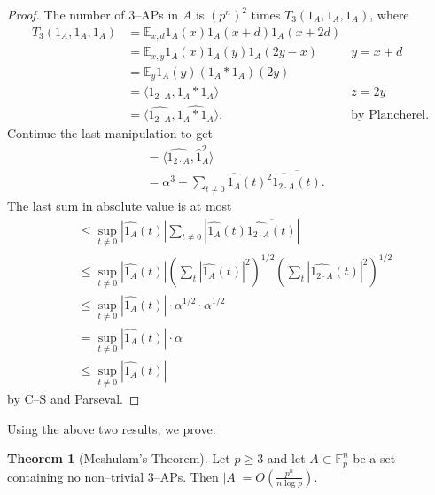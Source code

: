 \documentclass{article}
\theoremstyle{definition}
\newtheorem{theorem}{Theorem}[section]
\begin{document}
\begin{proof}
    The number of 3--APs in $A$ is $(p^n)^2$ times $T_3(1_A,1_A,1_A)$, where
    \begin{align*}
        T_3(1_A,1_A,1_A) &= \mathbb{E}_{x,d}1_A(x)1_A(x+d)1_A(x+2d) \\
        &= \mathbb{E}_{x,y}1_A(x)1_A(y)1_A(2y-x) &y=x+d\\
        &= \mathbb{E}_{y}1_A(y) (1_A * 1_A)(2y) \\
        &= \langle 1_{2\cdot A}, 1_A * 1_A \rangle &z=2y\\
        &= \langle \widehat{1_{2\cdot A}}, \widehat{1_A * 1_A}\rangle. &\text{by Plancherel}.
    \end{align*}
    Continue the last manipulation to get 
    \begin{align*}
        &= \langle \widehat{1_{2\cdot A}}, \hat{1}_A^2 \rangle \\
        &= \alpha^3 + \sum_{t \neq 0}^{} \widehat{1_A}(t)^2 \overline{\widehat{1_{2\cdot A}}(t)}.
    \end{align*}
    The last sum in absolute value is at most 
    \begin{align*}
        &\le \sup_{t \neq 0}|\widehat{1_A}(t)|\sum_{t\neq0}^{} |\widehat{1_A}(t)\overline{\widehat{1_{2\cdot A}}(t)}| \\
        &\le \sup_{t\neq 0}|\widehat{1_A}(t)| \left(\sum_{t}^{} |\widehat{1_A}(t)|^2\right)^{1/2}\left(\sum_{t}^{} |\widehat{1_{2\cdot A}}(t)|^2\right)^{1/2}\\
        &\le \sup_{t \neq 0}|\widehat{1_A}(t)|\cdot \alpha^{1/2} \cdot \alpha^{1/2} \\
        &= \sup_{t \neq 0}|\widehat{1_A}(t)|\cdot \alpha\\
        &\le \sup_{t \neq 0}|\widehat{1_A}(t)|
    \end{align*}
    by C--S and Parseval.
\end{proof}
Using the above two results, we prove:
\begin{theorem}[Meshulam's Theorem]\label{theorem1.17}
    Let $p\ge 3$ and let $A \subset \mathbb{F}_p^n$ be a set containing no non--trivial 3--APs. Then $|A| = O\left(\frac{p^n}{n \log p}\right)$. 
\end{theorem}
\end{document}
